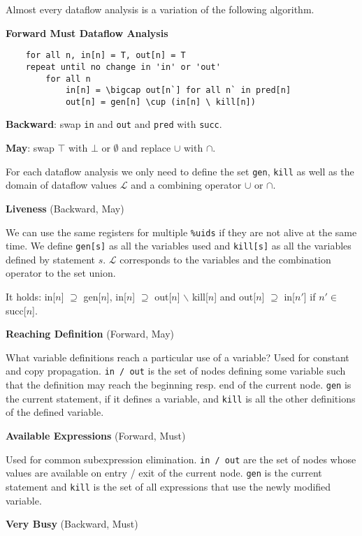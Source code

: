 Almost every dataflow analysis is a variation of the following algorithm. \smallskip

\textbf{Forward Must Dataflow Analysis}
\begin{lstlisting}
	for all n, in[n] = T, out[n] = T
	repeat until no change in 'in' or 'out'
		for all n
			in[n] = \bigcap out[n`] for all n` in pred[n]
			out[n] = gen[n] \cup (in[n] \ kill[n])	
\end{lstlisting}\medskip

\textbf{Backward}: swap \texttt{in} and \texttt{out} and \texttt{pred} with \texttt{succ}.\medskip

\textbf{May}: swap $\top$ with $\bot$ or $\emptyset$ and replace $\cup$ with $\cap$. \medskip

For each dataflow analysis we only need to define the set \texttt{gen}, \texttt{kill} as well as the domain of dataflow values $\mathcal L$ and a combining operator $\cup$ or $\cap$.\medskip

\textbf{Liveness} (Backward, May)\medskip

We can use the same registers for multiple \texttt{\%uids} if they are not alive at the same time. We define \texttt{gen[s]} as all the variables used and \texttt{kill[s]} as all the variables defined by statement $s$. $\mathcal L$ corresponds to the variables and the combination operator to the set union.\medskip

It holds: in[$n$] $\supseteq$ gen[$n$], in[$n$] $\supseteq$ out[$n$] $\backslash$ kill[$n$] and out[$n$] $\supseteq$ in[$n'$] if $n' \in $ succ[$n$].\medskip

\textbf{Reaching Definition} (Forward, May)\medskip

What variable definitions reach a particular use of a variable? Used for constant and copy propagation. \texttt{in / out} is the set of nodes defining some variable such that the definition may reach the beginning resp. end of the current node. \texttt{gen} is the current statement, if it defines a variable, and \texttt{kill} is all the other definitions of the defined variable. \medskip

\textbf{Available Expressions} (Forward, Must)\medskip

Used for common subexpression elimination. \texttt{in / out} are the set of nodes whose values are available on entry / exit of the current node. \texttt{gen} is the current statement and \texttt{kill} is the set of all expressions that use the newly modified variable.\medskip

\textbf{Very Busy} (Backward, Must)\medskip

